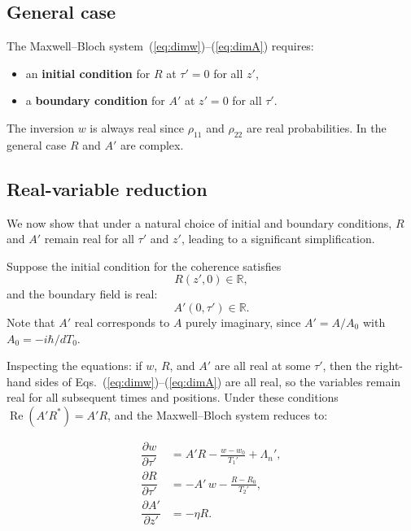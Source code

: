 \documentclass[12pt,a4paper]{article}
\newcommand{\T}{T_0}
\newcommand{\pderiv}[2]{\dfrac{\partial #1}{\partial #2}}
\begin{document}
\subsection{General case}

The Maxwell--Bloch system~(\ref{eq:dimw})--(\ref{eq:dimA}) requires:
\begin{itemize}
  \item an \textbf{initial condition} for $R$ at $\tau' = 0$ for all $z'$,
  \item a \textbf{boundary condition} for $A'$ at $z' = 0$ for all $\tau'$.
\end{itemize}
The inversion $w$ is always real since $\rho_{11}$ and $\rho_{22}$ are real
probabilities. In the general case $R$ and $A'$ are complex.

\subsection{Real-variable reduction}\label{subsec:real}

We now show that under a natural choice of initial and boundary conditions,
$R$ and $A'$ remain real for all $\tau'$ and $z'$, leading to a significant
simplification.

Suppose the initial condition for the coherence satisfies
\begin{equation}
  R(z', 0) \in \mathbb{R},
\end{equation}
and the boundary field is real:
\begin{equation}
  A'(0, \tau') \in \mathbb{R}.
\end{equation}
Note that $A'$ real corresponds to $A$ purely imaginary, since
$A'=A/A_0$ with $A_0= -i\hbar/d\T$.

Inspecting the equations: if $w$, $R$, and $A'$ are all real at some
$\tau'$, then the right-hand sides of
Eqs.~(\ref{eq:dimw})--(\ref{eq:dimA}) are all real, so the variables
remain real for all subsequent times and positions. Under these conditions
$\operatorname{Re}(A'R^*) = A'R$, and the Maxwell--Bloch system reduces to:

\begin{resultbox}
\begin{align}
  \pderiv{w}{\tau'}
    &= A'R - \frac{w - w_0}{T_1'} + \Lambda_n',
  \label{eq:realw}\\[8pt]
  \pderiv{R}{\tau'}
    &= -A'\,w - \frac{R-R_0}{T_2'},
  \label{eq:realR}\\[8pt]
  \pderiv{A'}{z'}
    &= -\eta R.
  \label{eq:realA}
\end{align}
\end{resultbox}
\end{document}
